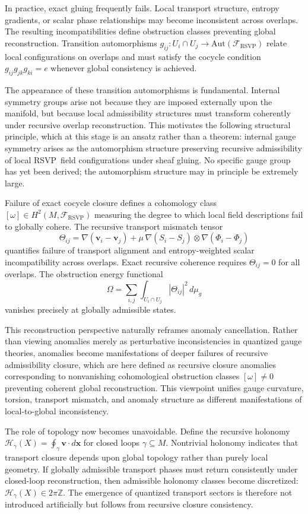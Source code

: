 \documentclass[12pt,a4paper]{article}
\newcommand{\RSVP}{\textrm{RSVP}}
\newcommand{\Sheaf}{\mathcal{F}}
\begin{document}
In practice, exact gluing frequently fails. Local transport structure, entropy
gradients, or scalar phase relationships may become inconsistent across overlaps.
The resulting incompatibilities define obstruction classes preventing global
reconstruction. Transition automorphisms $g_{ij}:U_i\cap U_j\to\mathrm{Aut}(\Sheaf_\RSVP)$
relate local configurations on overlaps and must satisfy the cocycle condition
$g_{ij}g_{jk}g_{ki}=e$ whenever global consistency is achieved.

The appearance of these transition automorphisms is fundamental. Internal
symmetry groups arise not because they are imposed externally upon the manifold,
but because local admissibility structures must transform coherently under
recursive overlap reconstruction. This motivates the following structural
principle, which at this stage is an ansatz rather than a theorem: internal
gauge symmetry arises as the automorphism structure preserving recursive
admissibility of local \RSVP\ field configurations under sheaf gluing. No
specific gauge group has yet been derived; the automorphism structure may in
principle be extremely large.

Failure of exact cocycle closure defines a cohomology class
$[\omega]\in H^2(M,\Sheaf_\RSVP)$ measuring the degree to which local field
descriptions fail to globally cohere. The recursive transport mismatch tensor
\[
\Theta_{ij}
= \nabla(\mathbf{v}_i-\mathbf{v}_j) + \mu\,\nabla(S_i-S_j)\otimes\nabla(\Phi_i-\Phi_j)
\]
quantifies failure of transport alignment and entropy-weighted scalar
incompatibility across overlaps. Exact recursive coherence requires $\Theta_{ij}=0$
for all overlaps. The obstruction energy functional
\[
\Omega = \sum_{i,j}\int_{U_i\cap U_j}|\Theta_{ij}|^2\,d\mu_g
\]
vanishes precisely at globally admissible states.

This reconstruction perspective naturally reframes anomaly cancellation.
Rather than viewing anomalies merely as perturbative inconsistencies in
quantized gauge theories, anomalies become manifestations of deeper failures of
recursive admissibility closure, which are here defined as recursive closure
anomalies corresponding to nonvanishing cohomological obstruction classes
$[\omega]\neq 0$ preventing coherent global reconstruction. This viewpoint
unifies gauge curvature, torsion, transport mismatch, and anomaly structure as
different manifestations of local-to-global inconsistency.

The role of topology now becomes unavoidable. Define the recursive holonomy
$\mathcal{H}_\gamma(X)=\oint_\gamma\mathbf{v}\cdot d\mathbf{x}$ for closed
loops $\gamma\subseteq M$. Nontrivial holonomy indicates that transport closure
depends upon global topology rather than purely local geometry. If globally
admissible transport phases must return consistently under closed-loop
reconstruction, then admissible holonomy classes become discretized:
$\mathcal{H}_\gamma(X)\in 2\pi\mathbb{Z}$. The emergence of quantized transport
sectors is therefore not introduced artificially but follows from recursive
closure consistency.
\end{document}
